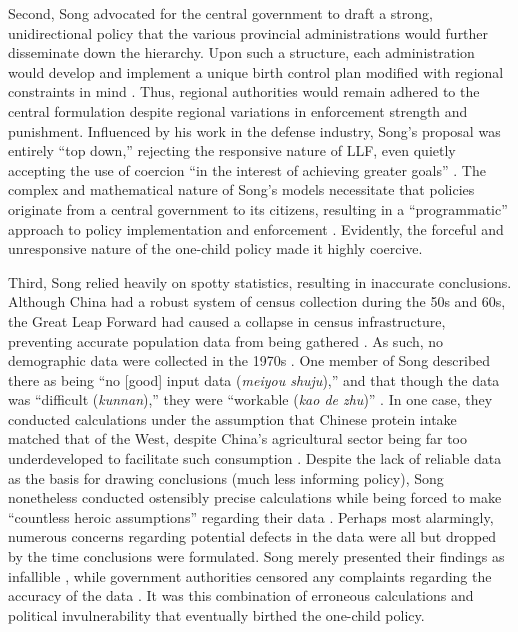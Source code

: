 \documentclass[12pt, a4paper, twoside]{article}
\begin{document}
Second, Song advocated for the central government to draft a strong, unidirectional policy that the various provincial administrations would further disseminate down the hierarchy. Upon such a structure, each administration would develop and implement a unique birth control plan modified with regional constraints in mind \autocite[pp.\ 29--32]{SongTuanYu1985}. Thus, regional authorities would remain adhered to the central formulation despite regional variations in enforcement strength and punishment. Influenced by his work in the defense industry, Song’s proposal was entirely “top down,” rejecting the responsive nature of LLF, even quietly accepting the use of coercion “in the interest of achieving greater goals” \autocite[p.\ 166]{Greenhalgh2008JustOneChild}. The complex and mathematical nature of Song’s models necessitate that policies originate from a central government to its citizens, resulting in a “programmatic” approach to policy implementation and enforcement \autocite[p.\ 262]{ArthurMcNicoll1975}. Evidently, the forceful and unresponsive nature of the one-child policy made it highly coercive.

Third, Song relied heavily on spotty statistics, resulting in inaccurate conclusions. Although China had a robust system of census collection during the 50s and 60s, the Great Leap Forward had caused a collapse in census infrastructure, preventing accurate population data from being gathered \autocite[chap.\ 2]{Banister1987}. As such, no demographic data were collected in the 1970s \autocite[p.\ 62]{Greenhalgh2008JustOneChild}. One member of Song described there as being “no [good] input data (\emph{meiyou shuju}),” and that though the data was “difficult (\emph{kunnan}),” they were “workable (\emph{kao de zhu})” \autocite[p.\ 161]{Greenhalgh2008JustOneChild}. In one case, they conducted calculations under the assumption that Chinese protein intake matched that of the West, despite China’s agricultural sector being far too underdeveloped to facilitate such consumption \autocite[p.\ 159]{Greenhalgh2008JustOneChild}. Despite the lack of reliable data as the basis for drawing conclusions (much less informing policy), Song nonetheless conducted ostensibly precise calculations while being forced to make “countless heroic assumptions” regarding their data \autocite{Greenhalgh2008JustOneChild}. Perhaps most alarmingly, numerous concerns regarding potential defects in the data were all but dropped by the time conclusions were formulated. Song merely presented their findings as infallible \autocite[pp.\ 161, 217]{Greenhalgh2008JustOneChild}, while government authorities censored any complaints regarding the accuracy of the data \autocite[pp.\ 257--259]{Greenhalgh2008JustOneChild}. It was this combination of erroneous calculations and political invulnerability that eventually birthed the one-child policy.
\end{document}

